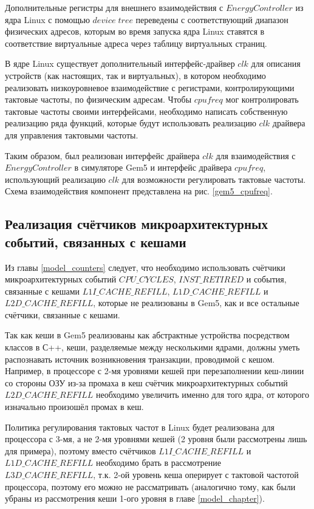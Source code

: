     Дополнительные регистры для внешнего взаимодействия с $EnergyController$ из ядра Linux с помощью
    $device \; tree$ переведены с соответствующий диапазон физических адресов, которым во время запуска ядра
    Linux ставятся в соответствие виртуальные адреса через таблицу виртуальных страниц.

    В ядре Linux существует дополнительный интерфейс-драйвер $clk$ для описания устройств (как
    настоящих, так и виртуальных), в котором необходимо реализовать низкоуровневое
    взаимодействие с регистрами, контролирующими тактовые частоты, по физическим адресам.
    Чтобы $cpufreq$ мог контролировать тактовые частоты своими интерфейсами, необходимо написать собственную
    реализацию ряда функций, которые будут использовать реализацию $clk$ драйвера для управления
    тактовыми частоты.

    Таким образом, был реализован интерфейс драйвера $clk$ для взаимодействия с $EnergyController$
    в симуляторе Gem5 и интерфейс драйвера $cpufreq$, использующий реализацию $clk$ для возможности
    регулировать тактовые частоты. Схема взаимодействия компонент представлена на рис. \ref{gem5_cpufreq}.

\subsection{Реализация счётчиков микроархитектурных событий, связанных с кешами} \label{counters_impl}

    Из главы \ref{model_counters} следует, что необходимо использовать счётчики микроархитектурных
    событий $CPU\_CYCLES$, $INST\_RETIRED$ и события, связанные с кешами $L1I\_CACHE\_REFILL$,
    $L1D\_CACHE\_REFILL$ и $L2D\_CACHE\_REFILL$, которые не реализованы в Gem5, как и все остальные счётчики,
    связанные с кешами.

    Так как кеши в Gem5 реализованы как абстрактные устройства посредством классов в С++, кеши,
    разделяемые между несколькими ядрами, должны уметь распознавать источник возникновения транзакции,
    проводимой с кешом. Например, в процессоре с 2-мя уровнями кешей при перезаполнении кеш-линии со
    стороны ОЗУ из-за промаха в кеш счётчик микроархитектурных событий $L2D\_CACHE\_REFILL$
    необходимо увеличить именно для того ядра, от которого изначально произошёл промах в кеш.

    Политика регулирования тактовых частот в Linux будет реализована для процессора с 3-мя,
    а не 2-мя уровнями кешей (2 уровня были рассмотрены лишь для примера), поэтому вместо счётчиков
    $L1I\_CACHE\_REFILL$ и $L1D\_CACHE\_REFILL$ необходимо брать в рассмотрение $L3D\_CACHE\_REFILL$,
    т.к. 2-ой уровень кеша оперирует с тактовой частотой процессора, поэтому его можно не рассматривать
    (аналогично тому, как были убраны из рассмотрения кеши 1-ого уровня в главе \ref{model_chapter}).

